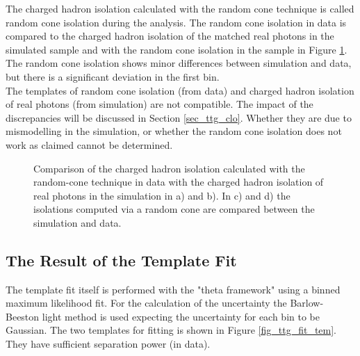 The charged hadron isolation calculated with the random cone technique is called random cone isolation during the analysis. The random cone isolation in data is compared to the charged hadron isolation of the matched real photons in the simulated \ttgamma sample and with the random cone isolation in the \ttgamma sample in Figure \ref{fig_ttg_fit_raco}.\\
The random cone isolation shows minor differences between simulation and data, but there is a significant deviation in the first bin. \\
The templates of random cone isolation (from data) and charged hadron isolation of real photons (from simulation) are not compatible. The impact of the discrepancies will be discussed in Section \ref{sec_ttg_clo}. Whether they are due to mismodelling in the simulation, or whether the random cone isolation does not work as claimed cannot be determined. \enlargethispage{\baselineskip}

\begin{figure}[ht]
  \caption{Comparison of the charged hadron isolation calculated with the random-cone technique in data with the charged hadron isolation of real photons in the \ttgamma simulation in a) and b). In c) and d) the isolations computed via a random cone are compared between the \ttgamma simulation and data.}
  \label{fig_ttg_fit_raco}
\end{figure}

\FloatBarrier
\subsection{The Result of the Template Fit}
\label{sec_ttg_fit_res}

The template fit itself is performed with the "theta framework" \cite{theta} using a binned maximum likelihood fit. For the calculation of the uncertainty the Barlow-Beeston light method is used \cite{Barlow:1993dm,2011arXiv1103.0354C} expecting the uncertainty for each bin to be Gaussian. The two templates for fitting is shown in Figure \ref{fig_ttg_fit_tem}. They have sufficient separation power (in data).\\

